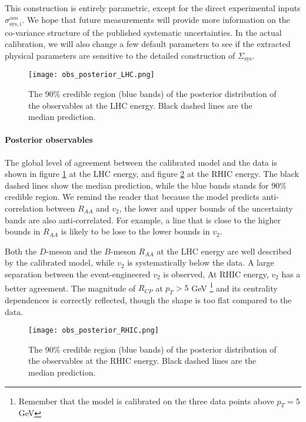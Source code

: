 This construction is entirely parametric, except for the direct experimental inputs $\sigma^{\alpha m}_{\textrm{sys}, i}$.
We hope that future measurements will provide more information on the co-variance structure of the published systematic uncertainties.
In the actual calibration, we will also change a few default parameters to see if the extracted physical parameters are sensitive to the detailed construction of $\Sigma_{\textrm{sys}}$.

\begin{figure}
\centering
\texttt{[image: obs\_posterior\_LHC.png]}
\caption{The 90\% credible region (blue bands) of the posterior distribution of the observables at the LHC energy. Black dashed lines are the median prediction.}
\label{fig:new:obs_posterior_LHC}
\end{figure}

\paragraph{Posterior observables} The global level of agreement between the calibrated model and the data is shown in figure \ref{fig:new:obs_posterior_LHC} at the LHC energy, and figure \ref{fig:new:obs_posterior_RHIC} at the RHIC energy.
The black dashed lines show the median prediction, while the blue bands stands for $90\%$ credible region.
We remind the reader that because the model predicts anti-correlation between $R_{AA}$ and $v_2$, the lower and upper bounds of the uncertainty bands are also anti-correlated.
For example, a line that is close to the higher bounds in $R_{AA}$ is likely to be lose to the lower bounds in $v_2$.

Both the $D$-meson and the $B$-meson $R_{AA}$ at the LHC energy are well described by the calibrated model, while $v_2$ is systematically below the data.
A large separation between the event-engineered $v_2$ is observed, 
At RHIC energy, $v_2$ has a better agreement. 
The magnitude of $R_{CP}$ at $p_T> 5$ GeV \footnote{Remember that the model is calibrated on the three data points above $p_T=5$ GeV} and its centrality dependences is correctly reflected, though the shape is too flat compared to the data.

\begin{figure}
\centering
\texttt{[image: obs\_posterior\_RHIC.png]}
\caption{The 90\% credible region (blue bands) of the posterior distribution of the observables at the RHIC energy. Black dashed lines are the median prediction.}
\label{fig:new:obs_posterior_RHIC}
\end{figure}

